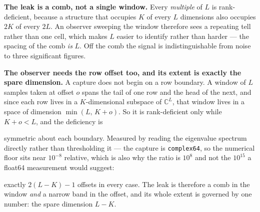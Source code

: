 \documentclass[10pt,letterpaper,twocolumn]{article}
\begin{document}
\textbf{The leak is a comb, not a single window.} Every \emph{multiple} of \(L\) is rank-deficient, because a structure that occupies \(K\) of every \(L\) dimensions also occupies \(2K\) of every \(2L\). An observer sweeping the window therefore sees a repeating tell rather than one cell, which makes \(L\) easier to identify rather than harder --- the spacing of the comb \emph{is} \(L\). Off the comb the signal is indistinguishable from noise to three significant figures.

\textbf{The observer needs the row offset too, and its extent is exactly the spare dimension.} A capture does not begin on a row boundary. A window of \(L\) samples taken at offset \(o\) spans the tail of one row and the head of the next, and since each row lives in a \(K\)-dimensional subspace of \(\mathbb{C}^L\), that window lives in a space of dimension \(\min(L,\,K+o)\). So it is rank-deficient only while \(K + o < L\), and the deficiency is


symmetric about each boundary. Measured by reading the eigenvalue spectrum directly rather than thresholding it --- the capture is \texttt{complex64}, so the numerical floor sits near \(10^{-8}\) relative, which is also why the ratio is \(10^{8}\) and not the \(10^{15}\) a float64 measurement would suggest:


exactly \(2(L-K) - 1\) offsets in every case. The leak is therefore a comb in the window \emph{and} a narrow band in the offset, and its whole extent is governed by one number: the spare dimension \(L - K\).
\end{document}
